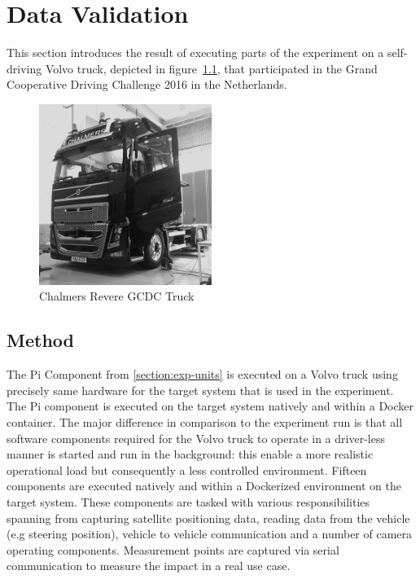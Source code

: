 \chapter{Data Validation}\label{section:data-validation}

This section introduces the result of executing parts of the experiment on a self-driving Volvo truck, depicted in figure~\ref{truck}, that participated in the Grand Cooperative Driving Challenge 2016 in the Netherlands. \\

\begin{figure}[ht]
\centering
     \includegraphics[width=0.5\textwidth]{./figure/truck.png}
      \caption{Chalmers Revere GCDC Truck}
       \label{truck}
\end{figure}


\section{Method}
The Pi Component from \ref{section:exp-units} is executed on a Volvo truck using precisely same hardware for the target system that is used in the experiment. The Pi component is executed on the target system natively and within a Docker container. The major difference in comparison to the experiment run is that all software components required for the Volvo truck to operate in a driver-less manner is started and run in the background: this enable a more realistic operational load but consequently a less controlled environment. Fifteen components are executed natively and within a Dockerized environment on the target system. These components are tasked with various responsibilities spanning from capturing satellite positioning data, reading data from the vehicle (e.g steering position), vehicle to vehicle communication and a number of camera operating components. Measurement points are captured via serial communication to measure the impact in a real use case. \\

